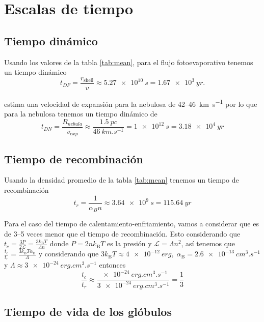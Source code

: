 \documentclass{book}
\begin{document}
\chapter{Escalas de tiempo}

\section{Tiempo dinámico}

Usando los valores de la tabla \ref{tab:mean}, para el flujo fotoevaporativo tenemos un tiempo dinámico 
\begin{equation}
t_{DF} = \frac{r_\mathrm{shell}}{v} \approx \SI{5.27e10}{s}  = \SI{1.67e3}{yr}.
\end{equation}

\cite{Mancherko:2010} estima una velocidad de expansión para la nebulosa de 42--\SI{46}{km.s^{-1}} por lo que para la nebulosa tenemos un tiempo dinámico de 
\begin{equation}
t_{DN}= \frac{R_{nebula}}{v_{exp}}\approx\frac{\SI{1.5}{pc}}{\SI{46}{km.s^{-1}}}= \SI{1e12}{s}=\SI{3.18e4}{yr}
\end{equation}

\section{Tiempo de recombinación}

Usando la densidad promedio de la tabla \ref{tab:mean} tenemos un tiempo de recombinación 
\begin{equation}
t_r = \frac{1}{\alpha_B n} \approx \SI{3.64e9}{s}= \SI{115.64}{yr}
\end{equation}

Para el caso del tiempo de calentamiento-enfriamiento, vamos a considerar que es de 3--5 veces menor que el tiempo de recombinación. Esto considerando que $t_c=\frac{3P}{2\mathcal{L}}=\frac{3k_\mathrm{B}T}{\Lambda n}$ donde $P=2nk_\mathrm{B}T$ es la presión y $\mathcal{L}=\Lambda n^2$, así tenemos que $\frac{t_c}{t_r}=\frac{3k_\mathrm{B}T\alpha_\mathrm{B}}{\Lambda}$ y considerando que $3k_\mathrm{B}T\approx\SI{4e-12}{erg},\; \alpha_\mathrm{B}=\SI{2.6e-13}{cm^3.s^{-1}}$ y $\Lambda\approx\SI{3e-24}{erg.cm^3.s^{-1}}$ entonces
\begin{equation}
    \frac{t_c}{t_r}\approx\frac{\SI{e-24}{erg.cm^3.s^{-1}}}{\SI{3e-24}{erg.cm^3.s^{-1}}}=\frac{1}{3}
\end{equation}

\section{Tiempo de vida de los glóbulos}
\end{document}
